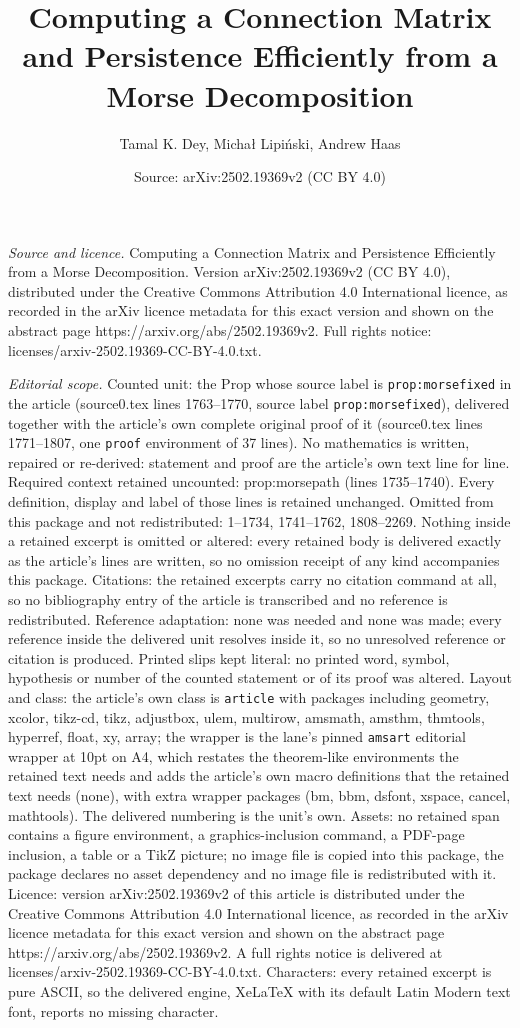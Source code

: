 \documentclass[10pt,a4paper]{amsart}
\title[Computing a Connection Matrix and Persistence Efficiently fr]{Computing a Connection Matrix and Persistence Efficiently from a Morse Decomposition}
\author{Tamal K. Dey, Micha{\l} Lipi\'nski, Andrew Haas}
\date{Source: arXiv:2502.19369v2 (CC BY 4.0)}
\begin{document}
\maketitle

\noindent\emph{Source and licence.} Computing a Connection Matrix and Persistence Efficiently from a Morse Decomposition. Version arXiv:2502.19369v2 (CC BY 4.0), distributed under the Creative Commons Attribution 4.0 International licence, as recorded in the arXiv licence metadata for this exact version and shown on the abstract page https://arxiv.org/abs/2502.19369v2. Full rights notice: licenses/arxiv-2502.19369-CC-BY-4.0.txt.\par\smallskip

\noindent\textit{Editorial scope.} Counted unit: the Prop whose source label is \texttt{prop:morsefixed} in the article (source0.tex lines 1763--1770, source label \texttt{prop:morsefixed}), delivered together with the article's own complete original proof of it (source0.tex lines 1771--1807, one \texttt{proof} environment of 37 lines). No mathematics is written, repaired or re-derived: statement and proof are the article's own text line for line. Required context retained uncounted: prop:morsepath (lines 1735--1740). Every definition, display and label of those lines is retained unchanged. Omitted from this package and not redistributed: 1--1734, 1741--1762, 1808--2269. Nothing inside a retained excerpt is omitted or altered: every retained body is delivered exactly as the article's lines are written, so no omission receipt of any kind accompanies this package. Citations: the retained excerpts carry no citation command at all, so no bibliography entry of the article is transcribed and no reference is redistributed. Reference adaptation: none was needed and none was made; every reference inside the delivered unit resolves inside it, so no unresolved reference or citation is produced. Printed slips kept literal: no printed word, symbol, hypothesis or number of the counted statement or of its proof was altered. Layout and class: the article's own class is \texttt{article} with packages including geometry, xcolor, tikz-cd, tikz, adjustbox, ulem, multirow, amsmath, amsthm, thmtools, hyperref, float, xy, array; the wrapper is the lane's pinned \texttt{amsart} editorial wrapper at 10pt on A4, which restates the theorem-like environments the retained text needs and adds the article's own macro definitions that the retained text needs (none), with extra wrapper packages (bm, bbm, dsfont, xspace, cancel, mathtools). The delivered numbering is the unit's own. Assets: no retained span contains a figure environment, a graphics-inclusion command, a PDF-page inclusion, a table or a TikZ picture; no image file is copied into this package, the package declares no asset dependency and no image file is redistributed with it. Licence: version arXiv:2502.19369v2 of this article is distributed under the Creative Commons Attribution 4.0 International licence, as recorded in the arXiv licence metadata for this exact version and shown on the abstract page https://arxiv.org/abs/2502.19369v2. A full rights notice is delivered at licenses/arxiv-2502.19369-CC-BY-4.0.txt. Characters: every retained excerpt is pure ASCII, so the delivered engine, XeLaTeX with its default Latin Modern text font, reports no missing character.
\end{document}
